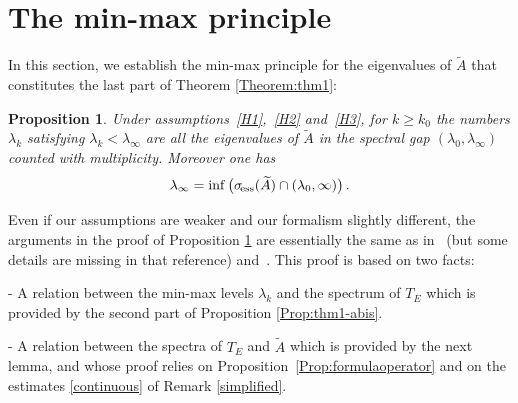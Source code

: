 \documentclass[12pt,reqno]{amsart}
\newtheorem{proposition}[theorem]{Proposition}
\renewcommand{\(}{\left(}
\renewcommand{\)}{\right)}
\begin{document}
\section{The min-max principle}\label{Section:min-max}

In this section, we establish the min-max principle for the eigenvalues of $\widetilde A$ that constitutes the last part of Theorem \ref{Theorem:thm1}:
\begin{proposition}\label{Prop:thm1-c} Under assumptions~\eqref{H1},~\eqref{H2} and~\eqref{H3}, for $k\ge k_0$ the numbers $\lambda_k$ satisfying $\lambda_k<\lambda_\infty$ are all the eigenvalues of $\widetilde A$ in the spectral gap $(\lambda_0, \lambda_\infty)$ counted with multiplicity. Moreover one has
\[\lambda_\infty=\inf \big(\sigma_{\!\rm ess}(\widetilde A)\cap (\lambda_0,\infty)\big)\,.\]
\end{proposition}

\noindent Even if our assumptions are weaker and our formalism slightly different, the arguments in the proof of Proposition \ref{Prop:thm1-c} are essentially the same as in~\cite[\S~2]{DES00a} (but some details are missing in that reference) and~\cite[\S~2.6]{SST20}. This proof is based on two facts:
 
 - A relation between the min-max levels $\lambda_k$ and the spectrum of $T_E$ which is provided by the second part of Proposition \ref{Prop:thm1-abis}.
 
 - A relation between the spectra of $T_E$ and $\widetilde A$ which is provided by the next lemma, and whose proof relies on Proposition~\ref{Prop:formulaoperator} and on the estimates \eqref{continuous} of Remark \ref{simplified}.
\end{document}
